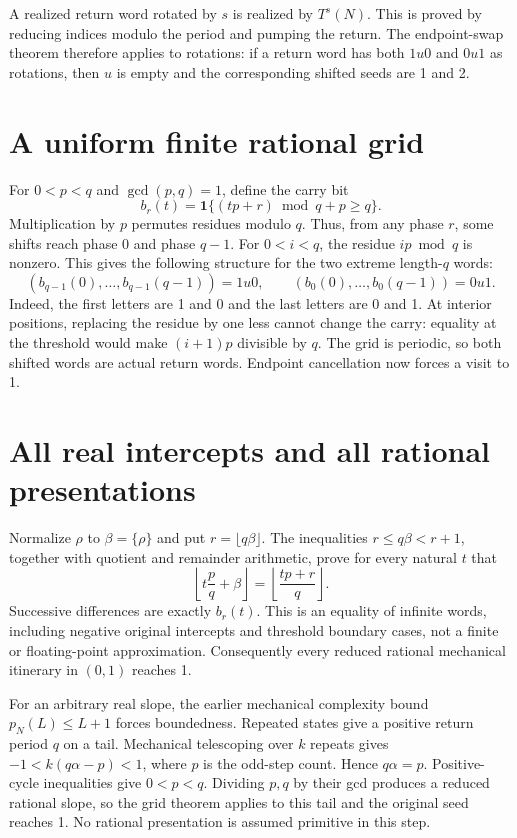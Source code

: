 \documentclass[10pt]{article}
\begin{document}
A realized return word rotated by $s$ is realized by $T^s(N)$.
This is proved by reducing indices modulo the period and pumping the
return. The endpoint-swap theorem therefore applies to rotations: if a
return word has both $1u0$ and $0u1$ as rotations, then $u$ is empty and
the corresponding shifted seeds are 1 and 2.

\section{A uniform finite rational grid}
For $0<p<q$ and $\gcd(p,q)=1$, define the carry bit
\[
 b_r(t)=\mathbf1\{(tp+r)\bmod q+p\ge q\}.
\]
Multiplication by $p$ permutes residues modulo $q$. Thus, from any phase
$r$, some shifts reach phase 0 and phase $q-1$.
For $0<i<q$, the residue $ip\bmod q$ is nonzero. This gives the following
structure for the two extreme length-$q$ words:
\[
 (b_{q-1}(0),\ldots,b_{q-1}(q-1))=1u0,\qquad
 (b_0(0),\ldots,b_0(q-1))=0u1.
\]
Indeed, the first letters are 1 and 0 and the last letters are 0 and 1.
At interior positions, replacing the residue by one less cannot change
the carry: equality at the threshold would make $(i+1)p$ divisible by $q$.
The grid is periodic, so both shifted words are actual return words.
Endpoint cancellation now forces a visit to 1.

\section{All real intercepts and all rational presentations}
Normalize $\rho$ to $\beta=\{\rho\}$ and put $r=\lfloor q\beta\rfloor$.
The inequalities $r\le q\beta<r+1$, together with quotient and remainder
arithmetic, prove for every natural $t$ that
\[
 \left\lfloor t\frac pq+\beta\right\rfloor
 =\left\lfloor\frac{tp+r}{q}\right\rfloor.
\]
Successive differences are exactly $b_r(t)$. This is an equality of
infinite words, including negative original intercepts and threshold
boundary cases, not a finite or floating-point approximation.
Consequently every reduced rational mechanical itinerary in $(0,1)$
reaches 1.

For an arbitrary real slope, the earlier mechanical complexity bound
$p_N(L)\le L+1$ forces boundedness. Repeated states give a positive return
period $q$ on a tail. Mechanical telescoping over $k$ repeats gives
$-1<k(q\alpha-p)<1$, where $p$ is the odd-step count. Hence $q\alpha=p$.
Positive-cycle inequalities give $0<p<q$. Dividing $p,q$ by their gcd
produces a reduced rational slope, so the grid theorem applies to this tail
and the original seed reaches 1. No rational presentation is assumed
primitive in this step.
\end{document}
